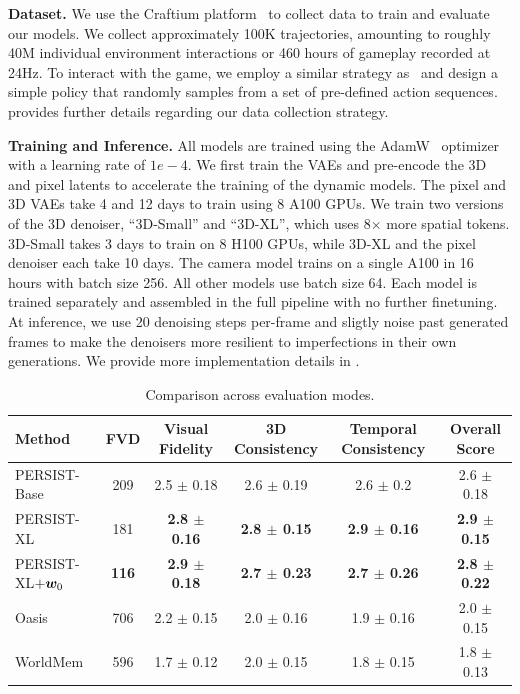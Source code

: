 \documentclass{article}
\theoremstyle{plain}
\theoremstyle{definition}
\theoremstyle{remark}
\begin{document}
\textbf{Dataset.} We use the Craftium platform~\citep{malagon2025craftium} to collect data to train and evaluate our models. We collect approximately 100K trajectories, amounting to roughly 40M individual environment interactions or 460 hours of gameplay recorded at 24Hz.
To interact with the game, we employ a similar strategy as~\citep{yu2025gamefactory} and design a simple policy that randomly samples from a set of pre-defined action sequences.  provides further details regarding our data collection strategy.

\textbf{Training and Inference.} All models are trained using the AdamW~\citep{loshchilov2018decoupled} optimizer with a learning rate of $1e-4$. We first train the VAEs and pre-encode the 3D and pixel latents to accelerate the training of the dynamic models. The pixel and 3D VAEs take 4 and 12 days to train using 8 A100 GPUs. We train two versions of the 3D denoiser, ``3D-Small'' and ``3D-XL'', which uses 8$\times$ more spatial tokens. 3D-Small takes 3 days to train on 8 H100 GPUs, while 3D-XL and the pixel denoiser each take 10 days. The camera model trains on a single A100 in 16 hours with batch size 256. All other models use batch size 64. Each model is trained separately and assembled in the full pipeline with no further finetuning. At inference, we use 20 denoising steps per-frame and sligtly noise past generated frames to make the denoisers more resilient to imperfections in their own generations. We provide more implementation details in .

\begin{table}[t]
  \centering
  \caption{Comparison across evaluation modes.}
    \begin{tabular}{lccccc}
    \toprule
    Method & FVD & Visual Fidelity & 3D Consistency & Temporal Consistency & Overall Score \\
    \midrule
    PERSIST-Base & 209 & 2.5 $\pm$ 0.18 & 2.6 $\pm$ 0.19 & 2.6 $\pm$ 0.2 & 2.6 $\pm$ 0.18 \\
    PERSIST-XL & 181 & \textbf{2.8 $\pm$ 0.16} & \textbf{2.8 $\pm$ 0.15} & \textbf{2.9 $\pm$ 0.16} & \textbf{2.9 $\pm$ 0.15} \\
    PERSIST-XL$+{\bm{w}}_0$ & \textbf{116} & \textbf{2.9 $\pm$ 0.18} & \textbf{2.7 $\pm$ 0.23} & \textbf{2.7 $\pm$ 0.26} & \textbf{2.8 $\pm$ 0.22} \\
    Oasis & 706 &2.2 $\pm$ 0.15 & 2.0 $\pm$ 0.16 & 1.9 $\pm$ 0.16 & 2.0 $\pm$ 0.15 \\
    WorldMem & 596 &1.7 $\pm$ 0.12 & 2.0 $\pm$ 0.15 & 1.8 $\pm$ 0.15 & 1.8 $\pm$ 0.13 \\
    \bottomrule
    \end{tabular}
  \label{tab:eval}
\end{table}
\end{document}
